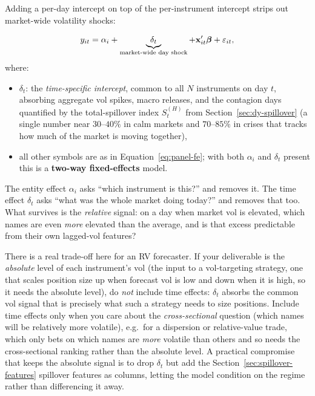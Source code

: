 Adding a per-day intercept on top of the per-instrument
intercept strips out market-wide volatility shocks:

\begin{equation}\label{eq:panel-twoway-fe}
  y_{it} = \alpha_i
           + \underbrace{\delta_t}_{\text{market-wide day shock}}
           + \mathbf{x}_{it}'\bm{\beta} + \varepsilon_{it},
\end{equation}
where:
\begin{itemize}[nosep]
  \item $\delta_t$: the \emph{time-specific intercept}, common to all $N$
        instruments on day $t$, absorbing aggregate vol spikes, macro releases,
        and the contagion days quantified by the total-spillover index $S^{(H)}_t$
        from Section~\ref{sec:dy-spillover} (a single number near $30$--$40\%$ in
        calm markets and $70$--$85\%$ in crises that tracks how much of the market
        is moving together),
  \item all other symbols are as in Equation~\eqref{eq:panel-fe}; with both
        $\alpha_i$ and $\delta_t$ present this is a \textbf{two-way fixed-effects}
        model.
\end{itemize}

\begin{intuition}
The entity effect $\alpha_i$ asks ``which instrument is this?'' and removes it.
The time effect $\delta_t$ asks ``what was the whole market doing today?'' and
removes that too.  What survives is the \emph{relative} signal: on a day when
market vol is elevated, which names are even \emph{more} elevated than the
average, and is that excess predictable from their own lagged-vol features?
\end{intuition}

\begin{projectconnection}
There is a real trade-off here for an RV forecaster.  If your deliverable is the
\emph{absolute} level of each instrument's vol (the input to a vol-targeting
strategy, one that scales position size up when forecast vol is low and down
when it is high, so it needs the absolute level), do \emph{not} include time
effects: $\delta_t$ absorbs the common vol signal that is precisely what such a
strategy needs to size positions.  Include time effects only when you care about
the \emph{cross-sectional} question (which names will be relatively more
volatile), e.g.\ for a dispersion or relative-value trade, which only bets on
which names are \emph{more} volatile than others and so needs the cross-sectional
ranking rather than the absolute level.  A practical compromise that
keeps the absolute signal is to drop $\delta_t$ but add the
Section~\ref{sec:spillover-features} spillover features as columns, letting the
model condition on the regime rather than differencing it away.
\end{projectconnection}

